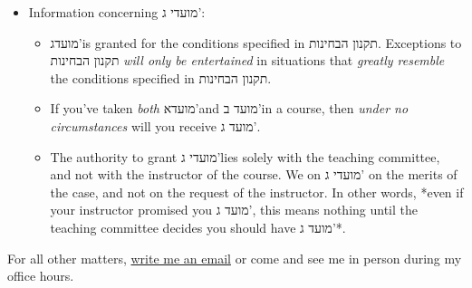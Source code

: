 \documentclass[11pt]{article}
\begin{document}
\begin{itemize}
\item Information concerning מועדי ג':
\begin{itemize}
\item מועדג'is granted for the conditions specified in תקנון הבחינות. Exceptions to תקנון הבחינות \emph{will only be entertained} in situations that \emph{greatly resemble} the conditions specified in תקנון הבחינות.
\item If you've taken \emph{both} מועדא'and מועד ב'in a course, then \emph{under no circumstances} will you receive מועד ג'.
\item The authority to grant מועדי ג'lies solely with the teaching committee, and not with the instructor of the course. We on מועדי ג' on the merits of the case, and not on the request of the instructor. In other words, *even if your instructor promised you מועד ג', this means nothing until the teaching committee decides you should have מועד ג'*.
\end{itemize}
\end{itemize}

For all other matters, \href{mailto:gmayer@little-lisper.org}{write me an email} or come and see me in person during my office hours. 
\end{document}
